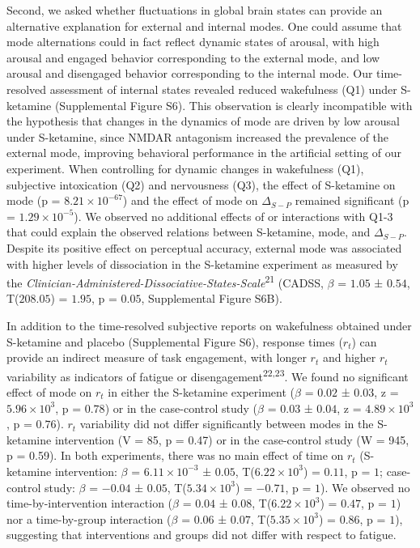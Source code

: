 \documentclass[
]{article}
\begin{document}
Second, we asked whether fluctuations in global brain states can provide
an alternative explanation for external and internal modes. One could
assume that mode alternations could in fact reflect dynamic states of
arousal, with high arousal and engaged behavior corresponding to the
external mode, and low arousal and disengaged behavior corresponding to
the internal mode. Our time-resolved assessment of internal states
revealed reduced wakefulness (Q1) under S-ketamine (Supplemental Figure
S6). This observation is clearly incompatible with the hypothesis that
changes in the dynamics of mode are driven by low arousal under
S-ketamine, since NMDAR antagonism increased the prevalence of the
external mode, improving behavioral performance in the artificial
setting of our experiment. When controlling for dynamic changes in
wakefulness (Q1), subjective intoxication (Q2) and nervousness (Q3), the
effect of S-ketamine on mode (p = \(\ensuremath{8.21\times 10^{-67}}\))
and the effect of mode on \(\Delta_{S-P}\) remained significant (p =
\(\ensuremath{1.29\times 10^{-5}}\)). We observed no additional effects
of or interactions with Q1-3 that could explain the observed relations
between S-ketamine, mode, and \(\Delta_{S-P}\). Despite its positive
effect on perceptual accuracy, external mode was associated with higher
levels of dissociation in the S-ketamine experiment as measured by the
\emph{Clinician-Administered-Dissociative-States-Scale}\textsuperscript{21}
(CADSS, \(\beta\) = \(1.05\) ± \(0.54\), T(\(208.05\)) = \(1.95\), p =
\(0.05\), Supplemental Figure S6B).

In addition to the time-resolved subjective reports on wakefulness
obtained under S-ketamine and placebo (Supplemental Figure S6), response
times (\(r_t\)) can provide an indirect measure of task engagement, with
longer \(r_t\) and higher \(r_t\) variability as indicators of fatigue
or disengagement\textsuperscript{22,23}. We found no significant effect
of mode on \(r_t\) in either the S-ketamine experiment (\(\beta\) =
\(0.02\) ± \(0.03\), z = \(\ensuremath{5.96\times 10^{3}}\), p =
\(0.78\)) or in the case-control study (\(\beta\) = \(0.03\) ± \(0.04\),
z = \(\ensuremath{4.89\times 10^{3}}\), p = \(0.76\)). \(r_t\)
variability did not differ significantly between modes in the S-ketamine
intervention (V = 85, p = 0.47) or in the case-control study (W = 945, p
= 0.59). In both experiments, there was no main effect of time on
\(r_t\) (S-ketamine intervention: \(\beta\) =
\(\ensuremath{6.11\times 10^{-3}}\) ± \(0.05\),
T(\(\ensuremath{6.22\times 10^{3}}\)) = \(0.11\), p = \(1\);
case-control study: \(\beta\) = \(-0.04\) ± \(0.05\),
T(\(\ensuremath{5.34\times 10^{3}}\)) = \(-0.71\), p = \(1\)). We
observed no time-by-intervention interaction (\(\beta\) = \(0.04\) ±
\(0.08\), T(\(\ensuremath{6.22\times 10^{3}}\)) = \(0.47\), p = \(1\))
nor a time-by-group interaction (\(\beta\) = \(0.06\) ± \(0.07\),
T(\(\ensuremath{5.35\times 10^{3}}\)) = \(0.86\), p = \(1\)), suggesting
that interventions and groups did not differ with respect to fatigue.
\end{document}
